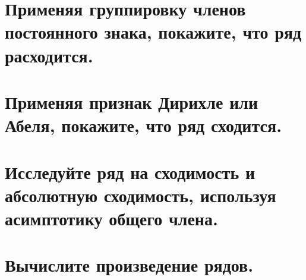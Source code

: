 \documentclass[a4paper,fleqn]{article}
\begin{document}
	
	
	\section*{Применяя группировку членов постоянного знака, покажите, что ряд расходится.}
	
	
	
	
	
	\section*{Применяя признак Дирихле или Абеля, покажите, что ряд сходится.}
	
	
	
	
	
	
	\section*{Исследуйте ряд на сходимость и абсолютную сходимость, используя асимптотику общего члена.}
	
	
	
	
	
	
	\section*{Вычислите произведение рядов.}
	
	
\end{document}
